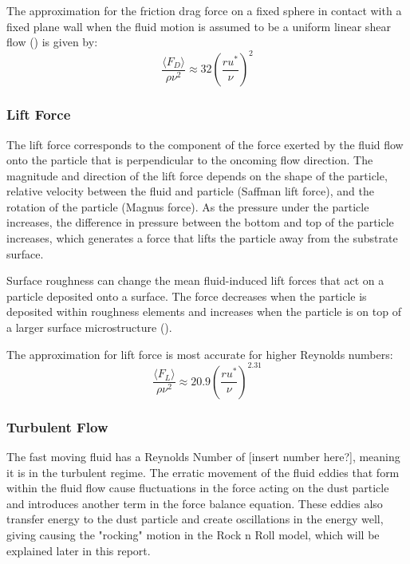 \documentclass{article}
\begin{document}
The approximation for the friction drag force on a fixed sphere in contact with a fixed plane wall when the fluid motion is assumed to be a uniform linear shear flow (\cite{ONEILL19681293}) is given by:
\begin{equation}\label{8}
\frac{\langle F_D \rangle}{\rho \nu^2} \approx 32 \left( \frac{r u^*}{\nu} \right)^2
\end{equation}

\subsubsection{Lift Force}

The lift force corresponds to the component of the force exerted by the fluid flow onto the particle that is perpendicular to the oncoming flow direction. The magnitude and direction of the lift force depends on the shape of the particle, relative velocity between the fluid and particle (Saffman lift force), and the rotation of the particle (Magnus force). As the pressure under the particle increases, the difference in pressure between the bottom and top of the particle increases, which generates a force that lifts the particle away from the substrate surface.

Surface roughness can change the mean fluid-induced lift forces that act on a particle deposited onto a surface. The force decreases when the particle is deposited within roughness elements and increases when the particle is on top of a larger surface microstructure (\cite{HALLD1988}).

The approximation for lift force is most accurate for higher Reynolds numbers: 
\begin{equation}\label{9}
\frac{\langle F_L \rangle}{\rho \nu^2} \approx 20.9 \left( \frac{r u^*}{\nu} \right)^{2.31}
\end{equation}

\subsubsection{Turbulent Flow}
The fast moving fluid has a Reynolds Number of [insert number here?], meaning it is in the turbulent regime. The erratic movement of the fluid eddies that form within the fluid flow cause fluctuations in the force acting on the dust particle and introduces another term in the force balance equation. These eddies also transfer energy to the dust particle and create oscillations in the energy well, giving causing the "rocking" motion in the Rock n Roll model, which will be explained later in this report. 
\end{document}
